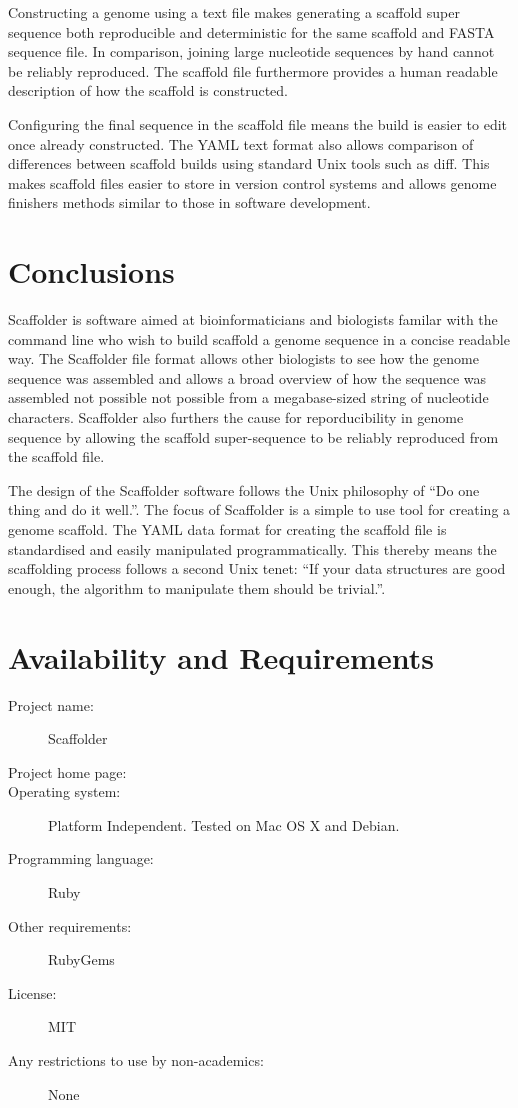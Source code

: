 \documentclass[10pt]{bmc_article}
\newenvironment{bmcformat}{\begin{raggedright}\baselineskip20pt\sloppy\setboolean{publ}{false}}{\end{raggedright}\baselineskip20pt\sloppy}
\begin{document}
\begin{bmcformat}
Constructing a genome using a text file makes generating a scaffold super
sequence both reproducible and deterministic for the same scaffold and FASTA
sequence file. In comparison, joining large nucleotide sequences by hand cannot
be reliably reproduced. The scaffold file furthermore provides a human readable
description of how the scaffold is constructed. \pb

Configuring the final sequence in the scaffold file means the build is easier
to edit once already constructed. The YAML text format also allows comparison
of differences between scaffold builds using standard Unix tools such as diff.
This makes scaffold files easier to store in version control systems and allows
genome finishers methods similar to those in software development. \pb 

\clearpage

\section*{Conclusions} %

Scaffolder is software aimed at bioinformaticians and biologists familar with
the command line who wish to build scaffold a genome sequence in a concise
readable way. The Scaffolder file format allows other biologists to see how the
genome sequence was assembled and allows a broad overview of how the sequence
was assembled not possible not possible from a megabase-sized string of
nucleotide characters. Scaffolder also furthers the cause for reporducibility
in genome sequence by allowing the scaffold super-sequence to be reliably
reproduced from the scaffold file. \pb

The design of the Scaffolder software follows the Unix philosophy of ``Do one
thing and do it well.''. The focus of Scaffolder is a simple to use tool for
creating a genome scaffold. The YAML data format for creating the scaffold file
is standardised and easily manipulated programmatically. This thereby means the
scaffolding process follows a second Unix tenet: ``If your data structures are
good enough, the algorithm to manipulate them should be trivial.''.

\clearpage

\section*{Availability and Requirements} %

  \begin{description}
    \item[Project name:] Scaffolder
    \item[Project home page:] \scaffolder
    \item[Operating system:] Platform Independent. Tested on Mac OS X and
    Debian.
    \item[Programming language:] Ruby
    \item[Other requirements:] RubyGems
    \item[License:] MIT
    \item[Any restrictions to use by non-academics:] None
  \end{description}


\end{bmcformat}
\end{document}
